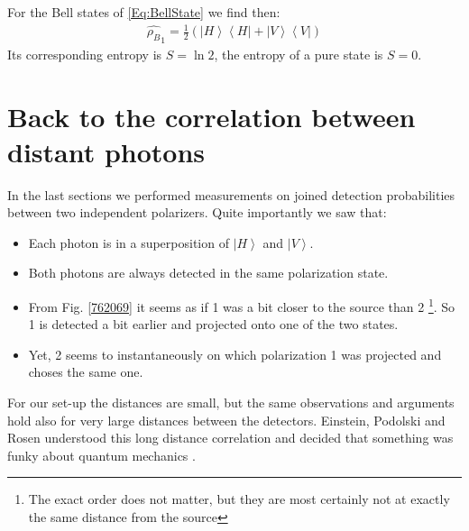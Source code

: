\documentclass[10pt]{article}
\let\cite\citep
\providecommand\citep{\cite}
\newcommand{\bra}[1]{\ensuremath{\left\langle#1\right|}}
\newcommand{\ket}[1]{\ensuremath{\left|#1\right\rangle}}
\begin{document}
For the Bell states of \eqref{Eq:BellState} we find then:
\begin{align}
\hat{\rho_B}_1 = \frac{1}{2} \left( \ket{H}\bra{H} + \ket{V}\bra{V} \right)
\end{align}
Its corresponding entropy is $S=\ln 2$, the entropy of a pure state is $S=0$.

\section{Back to the correlation between distant photons}
In the last sections we performed measurements on joined detection probabilities between two independent polarizers. Quite importantly we saw that:
\begin{itemize}
\item Each photon is in a superposition of $\ket{H}$ and $\ket{V}$.
\item Both photons are always detected in the same polarization state.
\item From Fig. \ref{762069} it seems as if 1 was a bit closer to the source than 2 \footnote{The exact order does not matter, but they are most certainly not at exactly the same distance from the source}. So 1 is detected a bit earlier and projected onto one of the two states.
\item Yet, 2 seems to instantaneously on which polarization 1 was projected and choses the same one. 
\end{itemize}

For our set-up the distances are small, but the same observations and arguments hold also for very large distances between the detectors. Einstein, Podolski and Rosen understood this long distance correlation and decided that something was funky about quantum mechanics \cite{Einstein_1935}. 
\end{document}
